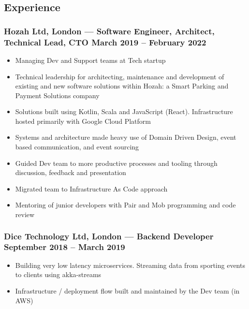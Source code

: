 \documentclass[10pt, a4paper]{article}
\newcommand{\cvdate}[1]{{\small\mdseries\color{darkgray}#1}}
\providecommand{\tightlist}{%
  \setlength{\itemsep}{1pt}\setlength{\parskip}{0pt}}
\begin{document}
\subsection{Experience}\label{experience}

\subsubsection{\texorpdfstring{Hozah Ltd, London --- Software Engineer,
Architect, Technical Lead, CTO
\hfill \cvdate{March 2019 – February 2022}}{Hozah Ltd, London --- Software Engineer, Architect, Technical Lead, CTO }}\label{hozah-ltd-london-software-engineer-architect-technical-lead-cto}

\begin{itemize}
\tightlist
\item
  Managing Dev and Support teams at Tech startup
\item
  Technical leadership for architecting, maintenance and development of
  existing and new software solutions within Hozah: a Smart Parking and
  Payment Solutions company
\item
  Solutions built using Kotlin, Scala and JavaScript (React).
  Infrastructure hosted primarily with Google Cloud Platform
\item
  Systems and architecture made heavy use of Domain Driven Design, event
  based communication, and event sourcing
\item
  Guided Dev team to more productive processes and tooling through
  discussion, feedback and presentation
\item
  Migrated team to Infrastructure As Code approach
\item
  Mentoring of junior developers with Pair and Mob programming and code
  review
\end{itemize}

\subsubsection{\texorpdfstring{Dice Technology Ltd, London --- Backend
Developer
\hfill \cvdate{September 2018 – March 2019}}{Dice Technology Ltd, London --- Backend Developer }}\label{dice-technology-ltd-london-backend-developer}

\begin{itemize}
\tightlist
\item
  Building very low latency microservices. Streaming data from sporting
  events to clients using akka-streams
\item
  Infrastructure / deployment flow built and maintained by the Dev team
  (in AWS)
\end{itemize}
\end{document}
